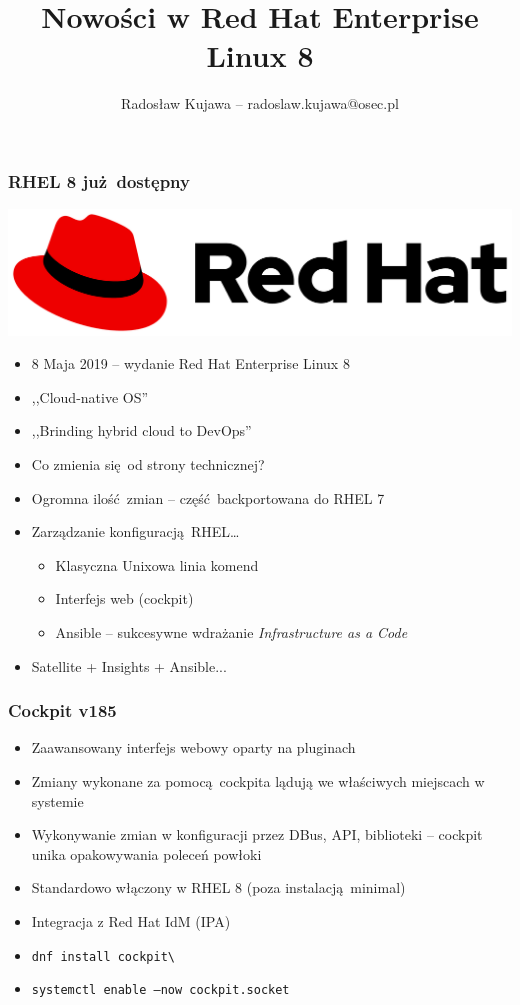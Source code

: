 \documentclass[dvipsnames,table]{beamer}
\title{Nowości w Red Hat Enterprise Linux 8}
\author{Radosław Kujawa -- radoslaw.kujawa@osec.pl}
\institute{OSEC}
\begin{document}
\begin{frame}
	\titlepage
\end{frame}

\begin{frame}
\frametitle{RHEL 8 już dostępny}
\begin{center}
\includegraphics[scale=0.1]{img-rhlogo.png}
\end{center}
\begin{itemize}
	\item 8 Maja 2019 -- wydanie Red Hat Enterprise Linux 8
	\item ,,Cloud-native OS''
	\item ,,Brinding hybrid cloud to DevOps''
	\item Co zmienia się od strony technicznej?
	\item Ogromna ilość zmian -- część backportowana do RHEL 7
	\item Zarządzanie konfiguracją RHEL\ldots
	\begin{itemize}
		\item Klasyczna Unixowa linia komend
		\item Interfejs web (cockpit)
		\item Ansible -- sukcesywne wdrażanie {\em Infrastructure as a Code}
	\end{itemize}
	\item Satellite + Insights + Ansible... %
\end{itemize}
\begin{center}
\end{center}
\end{frame}

\begin{frame}
\frametitle{Cockpit v185}
\begin{itemize}
	\item Zaawansowany interfejs webowy oparty na pluginach
	\item Zmiany wykonane za pomocą cockpita lądują we właściwych miejscach w systemie
	\item Wykonywanie zmian w konfiguracji przez DBus, API, biblioteki -- cockpit unika opakowywania poleceń powłoki
	\item Standardowo włączony w RHEL 8 (poza instalacją minimal)
	\item Integracja z Red Hat IdM (IPA)
	\item {\tt dnf install cockpit\textbackslash* }
	\item {\tt systemctl enable --now cockpit.socket}
\end{itemize}
\begin{center}
\end{center}
\end{frame}
\end{document}
